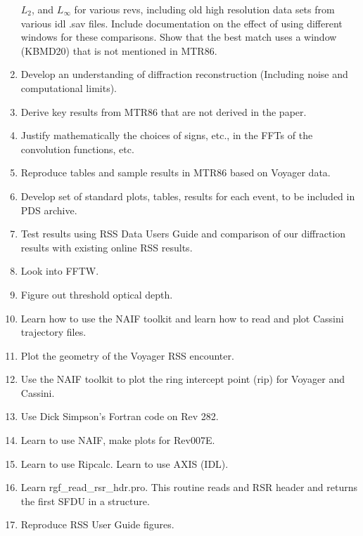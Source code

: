 \documentclass[crop=false,class=article,oneside]{standalone}
\begin{document}
\begin{enumerate}
                  $L_{2}$, and $L_{\infty}$ for various revs, including
                  old high resolution data sets from various idl .sav
                  files. Include documentation on the effect of using
                  different windows for these comparisons. Show that
                  the best match uses a window (KBMD20) that is not
                  mentioned in MTR86.
            \item Develop an understanding of diffraction
                  reconstruction (Including noise
                  and computational limits).
            \item Derive key results from MTR86 that are not
                  derived in the paper.
            \item Justify mathematically the choices of signs, etc.,
                  in the FFTs of the convolution functions, etc.
            \item Reproduce tables and sample results in MTR86
                  based on Voyager data.
            \item Develop set of standard plots, tables, results
                  for each event, to be included in PDS archive.
            \item Test results using RSS Data Users Guide and
                  comparison of our diffraction results with
                  existing online RSS results.
            \item Look into FFTW.
            \item Figure out threshold optical depth.
            \item Learn how to use the NAIF toolkit and learn
                  how to read and plot Cassini trajectory files.
            \item Plot the geometry of the Voyager RSS encounter.
            \item Use the NAIF toolkit to plot the ring
                  intercept point (rip) for Voyager and Cassini.
            \item Use Dick Simpson's Fortran code on Rev 282.
            \item Learn to use NAIF, make plots for Rev007E.
            \item Learn to use Ripcalc. Learn to use AXIS (IDL).
            \item Learn rgf\_read\_rsr\_hdr.pro. 
                  This routine reads and RSR header and returns
                  the first SFDU in a structure.
            \item Reproduce RSS User Guide figures.

\end{enumerate}
\end{document}
